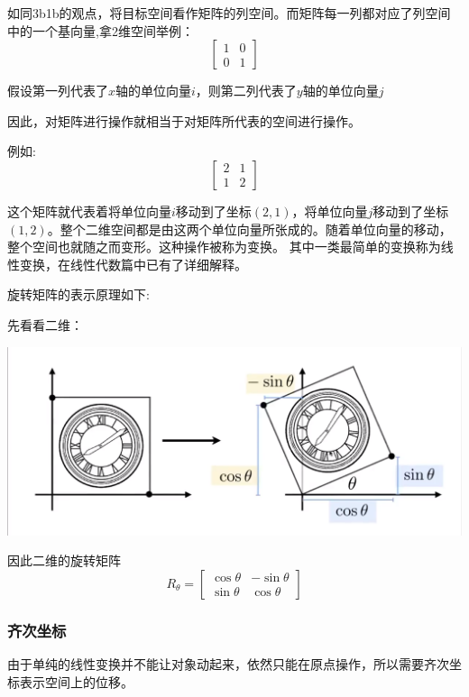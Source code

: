 \documentclass[UTF8]{ctexbook}
\begin{document}
{{{{        如同3b1b的观点，将目标空间看作矩阵的列空间。而矩阵每一列都对应了列空间中的一个基向量,拿2维空间举例：
        $$\left[\begin{matrix}
              1 & 0 \\
              0 & 1
            \end{matrix}\right]$$

        假设第一列代表了$x$轴的单位向量$i$，则第二列代表了$y$轴的单位向量$j$

        因此，对矩阵进行操作就相当于对矩阵所代表的空间进行操作。

        例如:$$\left[\begin{matrix}
              2 & 1 \\
              1 & 2
            \end{matrix}\right]$$

        这个矩阵就代表着将单位向量$i$移动到了坐标$(2,1)$，将单位向量$j$移动到了坐标$(1,2)$。整个二维空间都是由这两个单位向量所张成的。随着单位向量的移动，整个空间也就随之而变形。这种操作被称为变换。
        其中一类最简单的变换称为线性变换，在线性代数篇中已有了详细解释。

        旋转矩阵的表示原理如下:

        先看看二维：

        \includegraphics[scale=0.25]{resources/rotateMatrixGraphics.png}

        因此二维的旋转矩阵$$R_\theta = \left[\begin{matrix}
              \cos\theta & -\sin\theta \\
              \sin\theta & \cos\theta
            \end{matrix}\right]$$

      }%

      \subsubsection{齐次坐标}{
        由于单纯的线性变换并不能让对象动起来，依然只能在原点操作，所以需要齐次坐标表示空间上的位移。

}}}}
\end{document}
